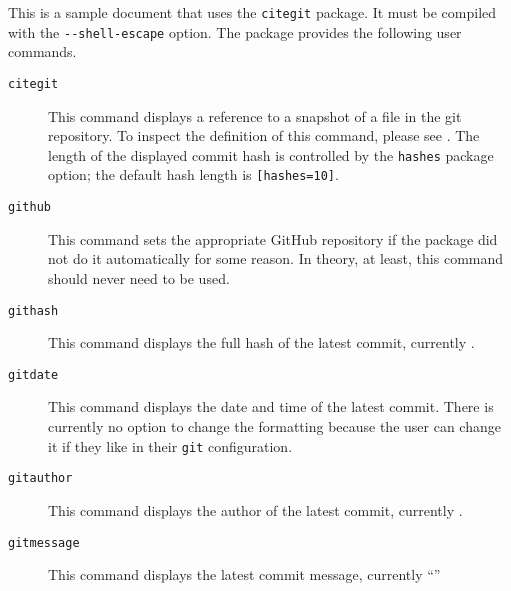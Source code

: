 \documentclass{article}
\begin{document}
	This is a sample document that uses the \verb+citegit+ package.
	It must be compiled with the \verb+--shell-escape+ option.
	The package provides the following user commands.
	\begin{description}
		\item[\texttt{citegit}]
		This command displays a reference to a snapshot of a file in the git
		repository.
		To inspect the definition of this command, please see
		.
		The length of the displayed commit hash is controlled by the \verb+hashes+
		package option; the default hash length is \verb+[hashes=10]+.
		\item[\texttt{github}]
		This command sets the appropriate GitHub repository if the package did
		not do it automatically for some reason.
		In theory, at least, this command should never need to be used.
		\item[\texttt{githash}]
		This command displays the full hash of the latest commit, currently \texttt{\githash}.
		\item[\texttt{gitdate}]
		This command displays the date and time of the latest commit.
		There is currently no option to change the formatting because
		the user can change it if they like in their \verb+git+ configuration.
		\item[\texttt{gitauthor}]
		This command displays the author of the latest commit, currently
		\gitauthor.
		\item[\texttt{gitmessage}]
		This command displays the latest commit message, currently
		``\gitmessage''
	\end{description}
\end{document}
